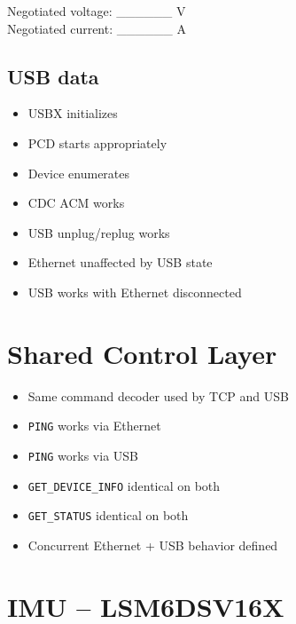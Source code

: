 \documentclass[10pt,a4paper,oneside]{report}
\providecommand{\tightlist}{\setlength{\itemsep}{1pt}\setlength{\parskip}{1pt}}
\begin{document}
Negotiated voltage: \_\_\_\_\_\_ V\\
Negotiated current: \_\_\_\_\_\_ A

\subsection{USB data}\label{wiki-hardware-bring-up-and-testing--132-usb-data}

\begin{itemize}
\tightlist
\item[$\square$]
  USBX initializes
\item[$\square$]
  PCD starts appropriately
\item[$\square$]
  Device enumerates
\item[$\square$]
  CDC ACM works
\item[$\square$]
  USB unplug/replug works
\item[$\square$]
  Ethernet unaffected by USB state
\item[$\square$]
  USB works with Ethernet disconnected
\end{itemize}

\section{Shared Control Layer}\label{wiki-hardware-bring-up-and-testing--14-shared-control-layer}

\begin{itemize}
\tightlist
\item[$\square$]
  Same command decoder used by TCP and USB
\item[$\square$]
  \texttt{PING} works via Ethernet
\item[$\square$]
  \texttt{PING} works via USB
\item[$\square$]
  \texttt{GET\_\allowbreak{}DEVICE\_\allowbreak{}INFO} identical on both
\item[$\square$]
  \texttt{GET\_\allowbreak{}STATUS} identical on both
\item[$\square$]
  Concurrent Ethernet + USB behavior defined
\end{itemize}

\section{IMU -- LSM6DSV16X}\label{wiki-hardware-bring-up-and-testing--15-imu--lsm6dsv16x}
\end{document}
